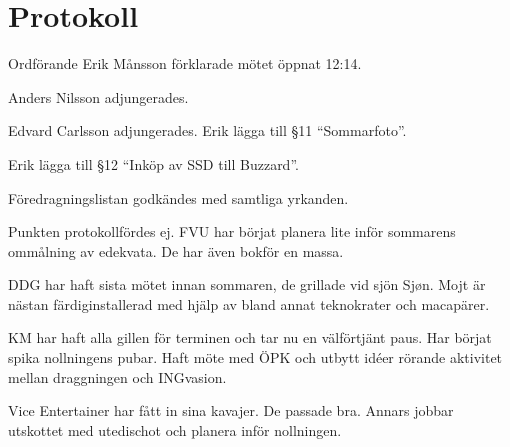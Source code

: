 \documentclass[10pt]{article}
\def\mo{Erik Månsson}
\begin{document}
\section*{Protokoll}
\begin{paragrafer}
Ordförande {\mo} förklarade mötet öppnat 12:14.

{\valavmo}

{\valavms}

{\valavj}

{\tosg}


Anders Nilsson adjungerades.

Edvard Carlsson adjungerades.
Erik \ypa lägga till \S11 ``Sommarfoto''.

Erik \ypa lägga till \S12 ``Inköp av SSD till Buzzard''.

Föredragningslistan godkändes med samtliga yrkanden.


\begin{fyllnadsval} %
\end{fyllnadsval}

\begin{paragrafer}
Punkten protokollfördes ej.
FVU har börjat planera lite inför sommarens ommålning av edekvata. De har även bokför en massa.

DDG har haft sista mötet innan sommaren, de grillade vid sjön Sjøn. Mojt är nästan färdiginstallerad med hjälp av bland annat teknokrater och macapärer.

KM har haft alla gillen för terminen och tar nu en välförtjänt paus. Har börjat spika nollningens pubar. Haft möte med ÖPK och utbytt idéer rörande aktivitet mellan draggningen och INGvasion.

Vice Entertainer har fått in sina kavajer. De passade bra. Annars jobbar utskottet med utedischot och planera inför nollningen.


\end{paragrafer}
\end{paragrafer}
\end{document}

